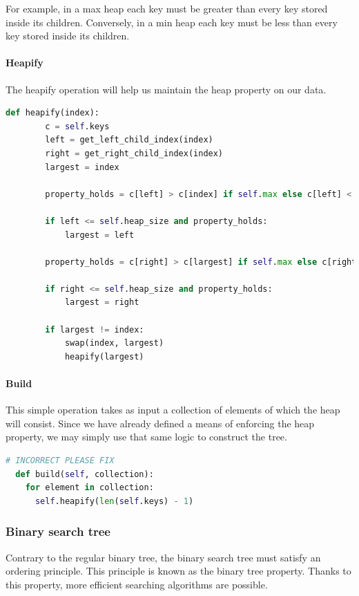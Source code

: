 \documentclass{article}
\begin{document}
For example, in a max heap each key must be greater than every key stored inside its children.
Conversely, in a min heap each key must be less than every key stored inside its children.

\paragraph{Heapify}
The heapify operation will help us maintain the heap property on our data.

\begin{lstlisting}[language=Python]
  def heapify(index):
        c = self.keys
        left = get_left_child_index(index)
        right = get_right_child_index(index)
        largest = index

        property_holds = c[left] > c[index] if self.max else c[left] < c[index]
        
        if left <= self.heap_size and property_holds:
            largest = left

        property_holds = c[right] > c[largest] if self.max else c[right] < c[largest]
        
        if right <= self.heap_size and property_holds:
            largest = right
        
        if largest != index:
            swap(index, largest)
            heapify(largest)
\end{lstlisting}

\paragraph{Build}
This simple operation takes as input a collection of elements of which the heap will consist.
Since we have already defined a means of enforcing the heap property, we may simply use that same logic to construct the tree.

\begin{lstlisting}[language=Python]
  # INCORRECT PLEASE FIX
  def build(self, collection):
    for element in collection:
      self.heapify(len(self.keys) - 1)
\end{lstlisting}

\subsubsection{Binary search tree}
Contrary to the regular binary tree, the binary search tree must satisfy an ordering principle.
This principle is known as the binary tree property. Thanks to this property,
more efficient searching algorithms are possible.
\end{document}
